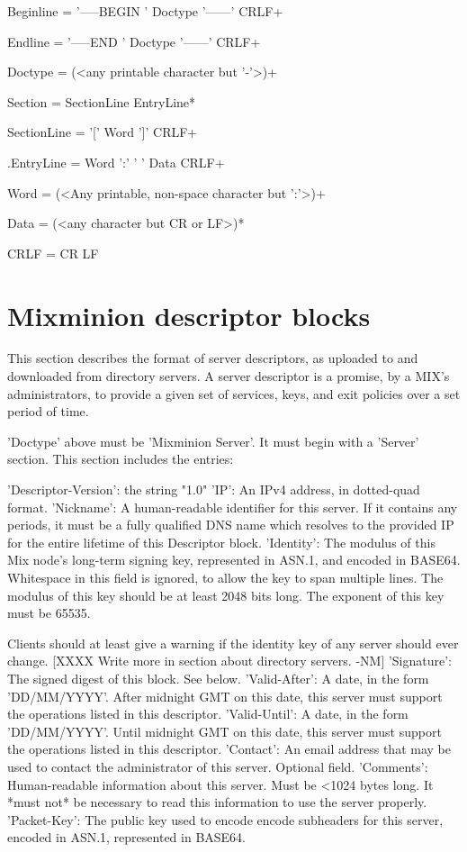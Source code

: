 Beginline = '-----BEGIN ' Doctype '------' CRLF+

Endline = '-----END ' Doctype '------' CRLF+

Doctype = (<any printable character but '-'>)+

Section = SectionLine EntryLine*

SectionLine = '[' Word ']' CRLF+

.EntryLine = Word ':' ' ' Data CRLF+

Word = (<Any printable, non-space character but ':'>)+

Data = (<any character but CR or LF>)*

CRLF = CR LF

\section{Mixminion descriptor blocks}

This section describes the format of server descriptors, as uploaded
to and downloaded from directory servers.  A server descriptor is a
promise, by a MIX's administrators, to provide a given set of
services, keys, and exit policies over a set period of time.

'Doctype' above must be 'Mixminion Server'.  It must begin with a
'Server' section.  This section includes the entries:

     'Descriptor-Version':  the string "1.0"
     'IP': An IPv4 address, in dotted-quad format.
     'Nickname': A human-readable identifier for this server.  If it
         contains any periods, it must be a fully qualified DNS name
         which resolves to the provided IP for the entire lifetime of
         this Descriptor block.
     'Identity': The modulus of this Mix node's long-term signing key,
         represented in ASN.1, and encoded in BASE64.  Whitespace in
         this field is ignored, to allow the key to span multiple
         lines.  The modulus of this key should be at least 2048 bits
         long.  The exponent of this key must be 65535.

	 Clients should at least give a warning if the identity key of
         any server should ever change. [XXXX Write more in section
         about directory servers. -NM]
     'Signature': The signed digest of this block.  See below.
     'Valid-After': A date, in the form 'DD/MM/YYYY'.  After midnight GMT
         on this date, this server must support the operations listed
         in this descriptor.
     'Valid-Until': A date, in the form 'DD/MM/YYYY'.  Until midnight
         GMT on this date, this server must support the operations listed
         in this descriptor.
     'Contact': An email address that may be used to contact the
         administrator of this server. Optional field.
     'Comments': Human-readable information about this server.  Must
         be <1024 bytes long.  It *must not* be necessary to read this
         information to use the server properly.
     'Packet-Key': The public key used to encode encode subheaders for
         this server, encoded in ASN.1, represented in BASE64. 

